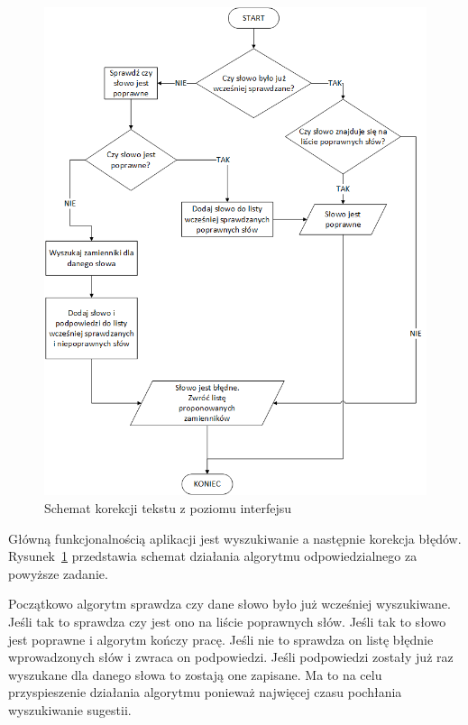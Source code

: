 \begin{figure} [H]
	\centering
	\includegraphics[width=1\linewidth]{rozdzial03/CorectorManager.png}
	\caption{Schemat korekcji tekstu z poziomu interfejsu}
	\label{fig:CorectorManager}
\end{figure}

\newpage

Główną funkcjonalnością aplikacji jest wyszukiwanie a następnie korekcja błędów. Rysunek~\ref{fig:CorectorManager} przedstawia schemat działania algorytmu odpowiedzialnego za powyższe zadanie. 

Początkowo algorytm sprawdza czy dane słowo było już wcześniej wyszukiwane. Jeśli tak to sprawdza czy jest ono na liście poprawnych słów. Jeśli tak to słowo jest poprawne i algorytm kończy pracę. Jeśli nie to sprawdza on listę błędnie wprowadzonych słów i zwraca on podpowiedzi. Jeśli podpowiedzi zostały już raz wyszukane dla danego słowa to zostają one zapisane. Ma to na celu przyspieszenie działania algorytmu ponieważ najwięcej czasu pochłania wyszukiwanie sugestii. 

